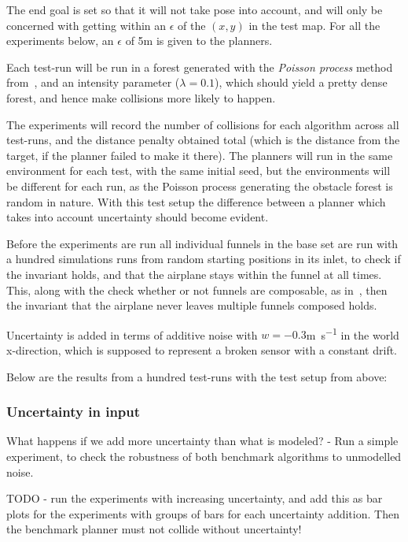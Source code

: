 The end goal is set so that it will not take pose into account, and will only be
concerned with getting within an \(\epsilon\) of the \((x,y)\) in the test map.
For all the experiments below, an \(\epsilon\) of 5\si{\metre} is given to the
planners.

Each test-run will be run in a forest generated with the \textit{Poisson
  process} method from~, and an intensity parameter
(\(\lambda = 0.1\)), which should yield a pretty dense forest, and hence make
collisions more likely to happen.

The experiments will record the number of collisions for each algorithm across
all test-runs, and the distance penalty obtained total (which is the distance
from the target, if the planner failed to make it there). The planners will run
in the same environment for each test, with the same initial seed, but the
environments will be different for each run, as the Poisson process generating
the obstacle forest is random in nature. With this test setup the difference
between a planner which takes into account uncertainty should become evident.

Before the experiments are run all individual funnels in the base set are run
with a hundred simulations runs from random starting positions in its inlet, to
check if the invariant holds, and that the airplane stays within the funnel at
all times. This, along with the check whether or not funnels are composable, as
in~, then the invariant that the airplane never
leaves multiple funnels composed holds.

Uncertainty is added in terms of additive noise with \(w = -0.3\)\si{m.s^{-1}}
in the world x-direction, which is supposed to represent a broken sensor with a
constant drift.

Below are the results from a hundred test-runs with the test setup from above:

\subsubsection{Uncertainty in input}

What happens if we add more uncertainty than what is modeled? - Run a simple
experiment, to check the robustness of both benchmark algorithms to unmodelled
noise.

TODO - run the experiments with increasing uncertainty, and add this as bar
plots for the experiments with groups of bars for each uncertainty addition.
Then the benchmark planner must not collide without uncertainty!

